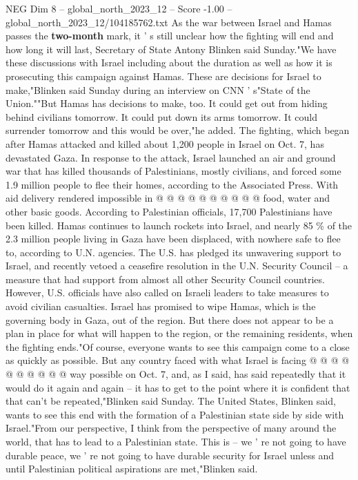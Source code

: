 \begin{textsample}{NEG Dim 8 – global\_north\_2023\_12 – Score -1.00 – global\_north\_2023\_12/104185762.txt}  \label{ex:f8_neg_343}
As the war between Israel and Hamas passes the \textbf{two-month} mark, it ' s still unclear how the fighting will end and how long it will last, Secretary of State Antony Blinken said Sunday."We have these discussions with Israel including about the duration as well as how it is prosecuting this campaign against Hamas.
These are decisions for Israel to make,"Blinken said Sunday during an interview on CNN ' s"State of the Union.""But Hamas has decisions to make, too.
It could get out from hiding behind civilians tomorrow.
It could put down its arms tomorrow.
It could surrender tomorrow and this would be over,"he added.
The fighting, which began after Hamas attacked and killed about 1,200 people in Israel on Oct. 7, has devastated Gaza.
In response to the attack, Israel launched an air and ground war that has killed thousands of Palestinians, mostly civilians, and forced some 1.9 million people to flee their homes, according to the Associated Press.
With aid delivery rendered impossible in @ @ @ @ @ @ @ @ @ @ food, water and other basic goods.
According to Palestinian officials, 17,700 Palestinians have been killed.
Hamas continues to launch rockets into Israel, and nearly 85 \% of the 2.3 million people living in Gaza have been displaced, with nowhere safe to flee to, according to U.N. agencies.
The U.S. has pledged its unwavering support to Israel, and recently vetoed a ceasefire resolution in the U.N.
Security Council -- a measure that had support from almost all other Security Council countries.
However, U.S. officials have also called on Israeli leaders to take measures to avoid civilian casualties.
Israel has promised to wipe Hamas, which is the governing body in Gaza, out of the region.
But there does not appear to be a plan in place for what will happen to the region, or the remaining residents, when the fighting ends."Of course, everyone wants to see this campaign come to a close as quickly as possible.
But any country faced with what Israel is facing @ @ @ @ @ @ @ @ @ @ way possible on Oct. 7, and, as I said, has said repeatedly that it would do it again and again -- it has to get to the point where it is confident that that can't be repeated,"Blinken said Sunday.
The United States, Blinken said, wants to see this end with the formation of a Palestinian state side by side with Israel."From our perspective, I think from the perspective of many around the world, that has to lead to a Palestinian state.
This is -- we ' re not going to have durable peace, we ' re not going to have durable security for Israel unless and until Palestinian political aspirations are met,"Blinken said.

\end{textsample}
